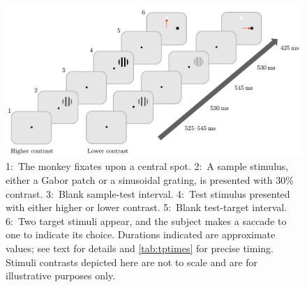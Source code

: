 \begin{figure}[tbhp]
\begin{center}
\includegraphics[width=\linewidth]{figs/task/PLtask1.pdf}
\end{center}
\caption{
1:~The monkey fixates upon a central spot.
2:~A sample stimulus, either a Gabor patch or a sinusoidal grating, is presented with $30\%$ contrast.
3:~Blank sample-test interval.
4:~Test stimulus presented with either higher or lower contrast.
5:~Blank test-target interval.
6:~Two target stimuli appear, and the subject makes a saccade to one to indicate its choice.
Durations indicated are approximate values; see text for details and \autoref{tab:tptimes} for precise timing.
Stimuli contrasts depicted here are not to scale and are for illustrative purposes only.
}
\label{fig:pltask1}
\end{figure}


